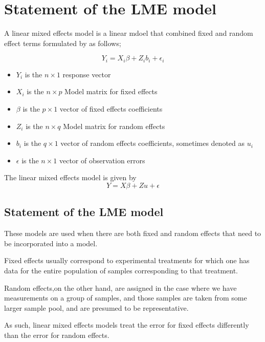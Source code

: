 \documentclass[12pt, a4paper]{report}
\theoremstyle{plain}
\theoremstyle{definition}
\theoremstyle{remark}
\begin{document}
\section{Statement of the LME model}
A linear mixed effects model is a linear mdoel that combined fixed and random effect terms formulated by \citet{LW82} as follows;

\begin{displaymath}
Y_{i} =X_{i}\beta + Z_{i}b_{i} + \epsilon_{i}
\end{displaymath}
\begin{itemize}
	
	\item $Y_{i}$ is the $n \times 1$ response vector \item $X_{i}$ is
	the $n \times p$ Model matrix for fixed effects \item $\beta$ is
	the $p \times 1$ vector of fixed effects coefficients \item
	$Z_{i}$ is the $n \times q$ Model matrix for random effects \item
	$b_{i}$ is the $q \times 1$ vector of random effects coefficients,
	sometimes denoted as $u_{i}$ \item $\epsilon$ is the $n \times 1$
	vector of observation errors
\end{itemize}


The linear mixed effects model is given by
\begin{equation}
Y = X\beta + Zu + \epsilon
\end{equation}



\subsection{Statement of the LME model}


These models are used when there are both fixed and random effects that need to be incorporated into a model.

Fixed effects usually correspond to experimental treatments for which one has data for the entire population of samples corresponding to that treatment.

Random effects,on the other hand, are assigned in the case where we have measurements on a group of samples, and those
samples are taken from some larger sample pool, and are presumed to be representative.

As such, linear mixed effects models treat the error for fixed effects differently than the error for random effects.
\end{document}
